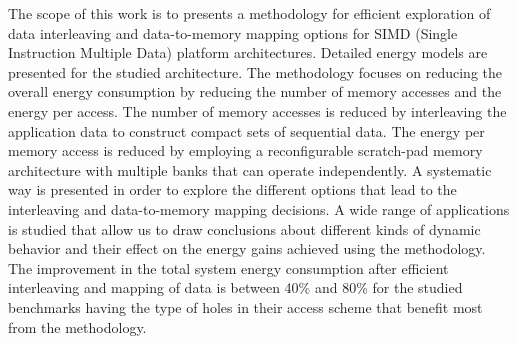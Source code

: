 \documentclass[prodmode,acmtecs]{acmsmall}
\begin{document}
The scope of this work is to presents a methodology for efficient exploration of data interleaving and data-to-memory mapping options for SIMD (Single Instruction Multiple Data) platform architectures.
Detailed energy models are presented for the studied architecture.
The methodology focuses on reducing the overall energy consumption by reducing the number of memory accesses and the energy per access.
The number of memory accesses is reduced by interleaving the application data to construct compact sets of sequential data.
The energy per memory access is reduced by employing a reconfigurable scratch-pad memory architecture with multiple banks that can operate independently.
A systematic way is presented in order to explore the different options that lead to the interleaving and data-to-memory mapping decisions.
A wide range of applications is studied that allow us to draw conclusions about different kinds of dynamic behavior and their effect on the energy gains achieved using the methodology. 
The improvement in the total system energy consumption after efficient interleaving and mapping of data is between 40\% and 80\% for the studied benchmarks having the type of holes in their access scheme that benefit most from the methodology.



\end{document}
